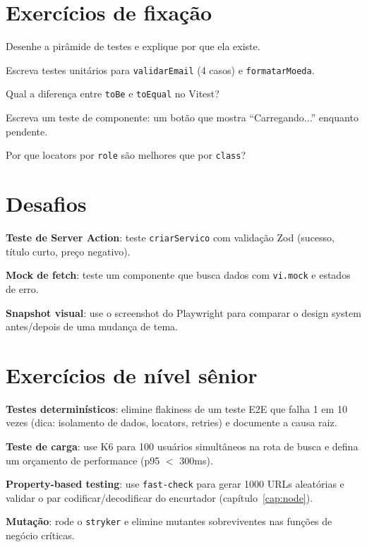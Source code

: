 \section{Exercícios de fixação}

\begin{exercicios}
  \item Desenhe a pirâmide de testes e explique por que ela existe.
  \item Escreva testes unitários para \texttt{validarEmail} (4 casos) e \texttt{formatarMoeda}.
  \item Qual a diferença entre \texttt{toBe} e \texttt{toEqual} no Vitest?
  \item Escreva um teste de componente: um botão que mostra ``Carregando...'' enquanto pendente.
  \item Por que locators por \texttt{role} são melhores que por \texttt{class}?
\end{exercicios}

\section{Desafios}

\begin{desafios}
  \item \textbf{Teste de Server Action}: teste \texttt{criarServico} com validação Zod (sucesso, título curto, preço negativo).
  \item \textbf{Mock de fetch}: teste um componente que busca dados com \texttt{vi.mock} e estados de erro.
  \item \textbf{Snapshot visual}: use o screenshot do Playwright para comparar o design system antes/depois de uma mudança de tema.
\end{desafios}

\section{Exercícios de nível sênior}

\begin{seniores}
  \item \textbf{Testes determinísticos}: elimine flakiness de um teste E2E que falha 1 em 10 vezes (dica: isolamento de dados, locators, retries) e documente a causa raiz.
  \item \textbf{Teste de carga}: use K6 para 100 usuários simultâneos na rota de busca e defina um orçamento de performance (p95 $<$ 300ms).
  \item \textbf{Property-based testing}: use \texttt{fast-check} para gerar 1000 URLs aleatórias e validar o par codificar/decodificar do encurtador (capítulo~\ref{cap:node}).
  \item \textbf{Mutação}: rode o \texttt{stryker} e elimine mutantes sobreviventes nas funções de negócio críticas.
\end{seniores}

